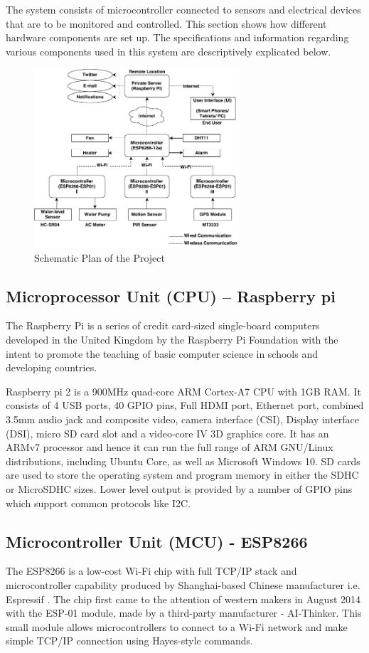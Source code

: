 \documentclass[journal,twoside]{IEEEtran}
\begin{document}
The system consists of microcontroller connected to sensors
and electrical devices that are to be monitored and controlled.
This section shows how different hardware components are set
up. The specifications and information regarding various
components used in this system are descriptively explicated
below.

\begin{figure}[!t]
\centering
\includegraphics[width=3.0in]{figure2}
\caption{Schematic Plan of the Project}
\label{fig:schema}
\end{figure}

\subsection{Microprocessor Unit (CPU) – Raspberry pi}
The Raspberry Pi is a series of credit card-sized single-board
computers developed in the United Kingdom by the Raspberry
Pi Foundation with the intent to promote the teaching of basic
computer science in schools and developing countries. 

Raspberry pi 2 is a 900MHz quad-core ARM Cortex-A7
CPU with 1GB RAM. It consists of 4 USB ports, 40 GPIO pins,
Full HDMI port, Ethernet port, combined 3.5mm audio jack and
composite video, camera interface (CSI), Display interface
(DSI), micro SD card slot and a video-core IV 3D graphics core.
It has an ARMv7 processor and hence it can run the full range of
ARM GNU/Linux distributions, including Ubuntu Core, as well
as Microsoft Windows 10. SD cards are used to store the
operating system and program memory in either the SDHC or
MicroSDHC sizes. Lower level output is provided by a number
of GPIO pins which support common protocols like I2C.


\subsection{Microcontroller Unit (MCU) - ESP8266}
The ESP8266 is a low-cost Wi-Fi chip with full TCP/IP stack
and microcontroller capability produced by Shanghai-based
Chinese manufacturer i.e. Espressif \cite{Espressif2016}. The chip first came to
the attention of western makers in August 2014 with the ESP-01
module, made by a third-party manufacturer - AI-Thinker. This
small module allows microcontrollers to connect to a Wi-Fi
network and make simple TCP/IP connection using Hayes-style
commands.
\end{document}
